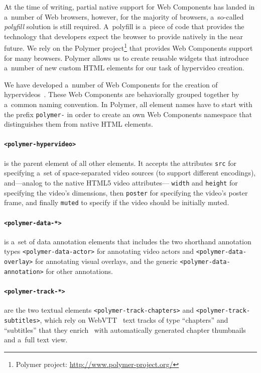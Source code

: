 \documentclass[conference]{IEEEtran}
\begin{document}
\noindent At the time of writing, partial native support for Web Components
has landed in a~number of Web browsers,
however, for the majority of browsers,
a~so-called \emph{polyfill} solution is still required.
A~polyfill  is a~piece of code that provides the technology
that developers expect the browser to provide natively in the near future.
We rely on the Polymer project\footnote{Polymer project:
\url{http://www.polymer-project.org/}}
that provides Web Components support for many browsers.
Polymer allows us to create reusable widgets that introduce a~number of new
custom HTML elements for our task of hypervideo creation.

We have developed a~number of Web Components for the creation of hypervideos~\cite{steiner2014hypervideo}.
These Web Components are behaviorally grouped together
by a~common naming convention.
In Polymer, all element names have to start with the prefix \texttt{polymer-}
in order to create an own Web Components namespace
that distinguishes them from native HTML elements.

\paragraph*{\texttt{<polymer-hypervideo>}} is the parent element of all other elements.
    It accepts the attributes \texttt{src} for specifying a~set of
    space-separated video sources (to support different encodings),
    and---analog to the native HTML5 video attributes---%
    \texttt{width} and \texttt{height} for specifying the video's dimensions,
    then \texttt{poster} for specifying the video's poster frame, and finally \texttt{muted} to specify if the video should be initially muted.

\paragraph*{\texttt{<polymer-data-*>}} is a~set of data annotation elements
    that includes the two shorthand annotation types
    \texttt{<polymer-data-actor>} for annotating video actors and
    \texttt{<polymer-data-overlay>} for annotating visual overlays,
    and the generic \texttt{<polymer-data-annotation>} for other annotations.

\paragraph*{\texttt{<polymer-track-*>}} are the two textual elements
    \texttt{<polymer-track-chapters>} and \texttt{<polymer-track-subtitles>},
    which rely on WebVTT~\cite{pfeiffer2013webvtt} text tracks
    of type ``chapters'' and ``subtitles'' that they enrich~\cite{steiner2014webvtt} with
    automatically generated chapter thumbnails and a~full text view.
    
\end{document}
